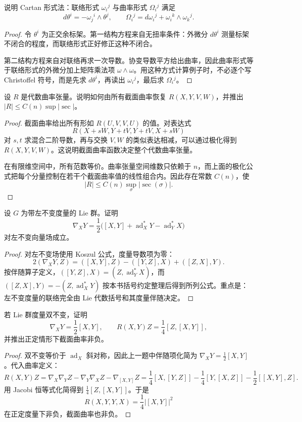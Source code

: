 \documentclass[11pt,a4paper,openany]{ctexbook}
\numberwithin{equation}{chapter}
\begin{document}
\begin{problem}
说明 Cartan 形式法：联络形式 \(\omega_i{}^j\) 与曲率形式 \(\Omega_i{}^j\) 满足
\[
d\theta^i=-\omega_j{}^i\wedge\theta^j,\qquad
\Omega_i{}^j=d\omega_i{}^j+\omega_i{}^k\wedge\omega_k{}^j.
\]
\end{problem}
\begin{proof}
令 \(\theta^i\) 为正交余标架。第一结构方程来自无扭率条件：外微分 \(d\theta^i\) 测量标架不闭合的程度，而联络形式正好修正这种不闭合。

第二结构方程来自对联络再求一次导数。协变导数平方给出曲率，因此曲率形式等于联络形式的外微分加上矩阵乘法项 \(\omega\wedge\omega\)。用这种方式计算例子时，不必逐个写 Christoffel 符号，而是先求 \(d\theta^i\)，再读出 \(\omega_i{}^j\)，最后求 \(\Omega_i{}^j\)。
\end{proof}

\begin{problem}
设 \(R\) 是代数曲率张量。说明如何由所有截面曲率恢复 \(R(X,Y,V,W)\)，并推出 \(|R|\le C(n)\sup|\sec|\)。
\end{problem}
\begin{proof}
截面曲率给出所有形如 \(R(U,V,V,U)\) 的值。对表达式
\[
R(X+sW,Y+tV,Y+tV,X+sW)
\]
对 \(s,t\) 求混合二阶导数，再与交换 \(V,W\) 的类似表达相减，可以通过极化得到 \(R(X,Y,V,W)\)。这说明截面曲率函数决定整个代数曲率张量。

在有限维空间中，所有范数等价。曲率张量空间维数只依赖于 \(n\)，而上面的极化公式把每个分量控制在若干个截面曲率值的线性组合内。因此存在常数 \(C(n)\)，使
\[
|R|\le C(n)\sup_\sigma|\sec(\sigma)|.
\]
\end{proof}

\begin{problem}
设 \(G\) 为带左不变度量的 Lie 群。证明
\[
\nabla_XY=\frac12\bigl([X,Y]+\operatorname{ad}_X^*Y-\operatorname{ad}_Y^*X\bigr)
\]
对左不变向量场成立。
\end{problem}
\begin{proof}
对左不变场使用 Koszul 公式，度量导数项为零：
\[
2(\nabla_XY,Z)=([X,Y],Z)-([Y,Z],X)+([Z,X],Y).
\]
按伴随算子定义，\(([Y,Z],X)=(Z,\operatorname{ad}_Y^*X)\)，而 \(([Z,X],Y)=-(Z,\operatorname{ad}_X^*Y)\) 按本书括号约定整理后得到所列公式。重点是：左不变度量的联络完全由 Lie 代数括号和其度量伴随决定。
\end{proof}

\begin{problem}
若 Lie 群度量双不变，证明
\[
\nabla_XY=\frac12[X,Y],\qquad
R(X,Y)Z=\frac14[Z,[X,Y]],
\]
并推出正定情形下截面曲率非负。
\end{problem}
\begin{proof}
双不变等价于 \(\operatorname{ad}_X\) 斜对称，因此上一题中伴随项化简为 \(\nabla_XY=\frac12[X,Y]\)。代入曲率定义：
\[
R(X,Y)Z=\nabla_X\nabla_YZ-\nabla_Y\nabla_XZ-\nabla_{[X,Y]}Z
=\frac14[X,[Y,Z]]-\frac14[Y,[X,Z]]-\frac12[[X,Y],Z].
\]
用 Jacobi 恒等式化简得到 \(\frac14[Z,[X,Y]]\)。于是
\[
R(X,Y,Y,X)=\frac14|[X,Y]|^2
\]
在正定度量下非负，截面曲率也非负。
\end{proof}
\end{document}
